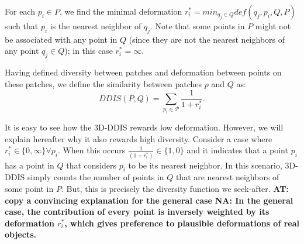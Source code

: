 \documentclass[10pt,twocolumn,letterpaper]{article}
\newcommand{\colornote}[3]{{\color{#1}\bf{#2: #3}\normalfont}}
\newcommand{\colornote}[3]{}
\newcommand {\ayellet}[1]{\colornote{blue}{AT}{#1}}
\newcommand {\nadav}[1]{\colornote{red}{NA}{#1}}
\begin{document}
For each $p_i \in P$, we find the minimal deformation $r_i^*=min_{q_j \in Q}def(q_j,p_i,Q,P)$ such that $p_i$ is the nearest neighbor of $q_j$.
Note that some points in $P$ might not be associated with any point in $Q$ (since they are not the nearest neighbors of any point $q_j\in Q$);
in this case $r_i^*=\infty$.

Having defined diversity between patches and deformation between points on these patches, we define the similarity between patches $p$ and $Q$ as:
\begin{equation}
DDIS(P,Q)=\sum_{p_i\in \mathcal{P}}\frac{1}{1+r_i^*}.
\label{eq:DDIS}
\end{equation}

It is easy to see how the 3D-DDIS rewards low deformation.
However, we will explain hereafter why it also rewards high diversity.
Consider a case where $r_i^*\in\{0,\infty\} \forall p_i$. 
When this occurs $\frac{1}{(1+r_i^*)}\in\{1,0\}$ and it indicates that a point $p_i$ has a point in $Q$ that considers $p_i$ to be its nearest neighbor.
In this scenario, 3D-DDIS simply counts the number of points in $Q$ that are nearest neighbors of some point in $P$.
But, this is precisely the diversity function we seek-after.
\ayellet{copy a convincing explanation for the general case}
\nadav{
In the general case, the contribution of every point is inversely weighted by its deformation $r_i^*$, which gives preference to plausible deformations of real objects.
}


\end{document}
